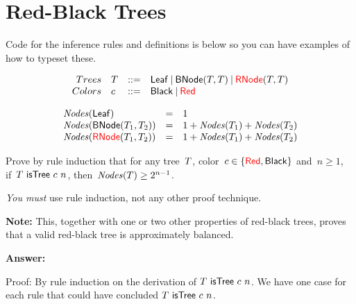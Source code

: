 \documentclass{article}
\begin{document}
\section{Red-Black Trees}
Code for the inference rules and definitions is below so you can have
examples of how to typeset these.

\[
\begin{array}{r l l l}
  Trees & T & \mathop{::=} & \mathsf{Leaf} \mathbin{|} \mathsf{BNode}(T, T) \mathbin{|}
  {\color{red}{\mathsf{RNode}}}(T, T)\\
  Colors & c & \mathop{::=} & \mathsf{Black} \mathbin{|} {\color{red}{\mathsf{Red}}}\\
\end{array}
\]

{
  \centering
  \def \MathparLineskip {\lineskip=0.43cm}
}

\[
\begin{array}{l l l}
  \mathit{Nodes}(\mathsf{Leaf}) & = & 1\\
  \mathit{Nodes}(\mathsf{BNode}(T_1, T_2)) & = & 1 + \mathit{Nodes}(T_1) + \mathit{Nodes}(T_2)\\
  \mathit{Nodes}({\color{red}{\mathsf{RNode}}}(T_1, T_2)) & = & 1 + \mathit{Nodes}(T_1) + \mathit{Nodes}(T_2)
\end{array}
\]

\begin{task}
  Prove by rule induction that for any tree~$T$,
  color~$c \in \{{\color{red}{\mathsf{Red}}}, \mathsf{Black}\}$ and~$n \geq 1$,
  if~$T ~\mathsf{isTree}~c~n$, then~$\mathit{Nodes}(T) \geq 2^{n-1}$.

  {\em You must} use rule induction, not any other proof technique.

  \textbf{Note:} This, together with one or two other properties of
  red-black trees, proves that a valid red-black tree is approximately
  balanced.
\end{task}

\textbf{Answer:}

Proof: By rule induction on the derivation of $T ~\mathsf{isTree}~c~n$.
We have one case for each rule that could have concluded
$T ~\mathsf{isTree}~c~n$.
\end{document}
